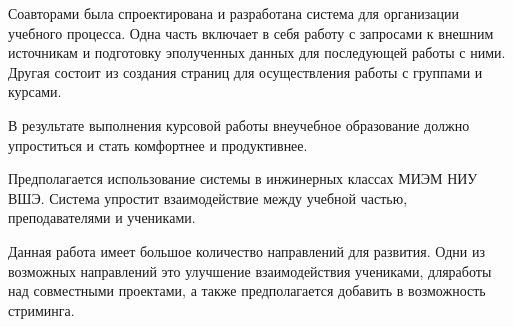 \documentclass[a4paper,14pt]{article}
\begin{document}

Соавторами была спроектирована и разработана система для организации учебного процесса.
Одна часть включает в себя работу с запросами к внешним источникам и подготовку эполученных данных для последующей работы с ними.
Другая состоит из создания страниц для осуществления работы с группами и курсами.


В результате выполнения курсовой работы внеучебное образование должно упроститься и стать комфортнее и продуктивнее.


Предполагается использование системы в инжинерных классах  МИЭМ НИУ ВШЭ.
Система упростит взаимодействие между учебной частью, преподавателями и учениками.


Данная работа имеет большое количество направлений для развития.
Одни из возможных направлений это улучшение взаимодействия учениками, дляработы над совместными проектами, а также предполагается добавить в возможность стриминга.  

\end{document}
